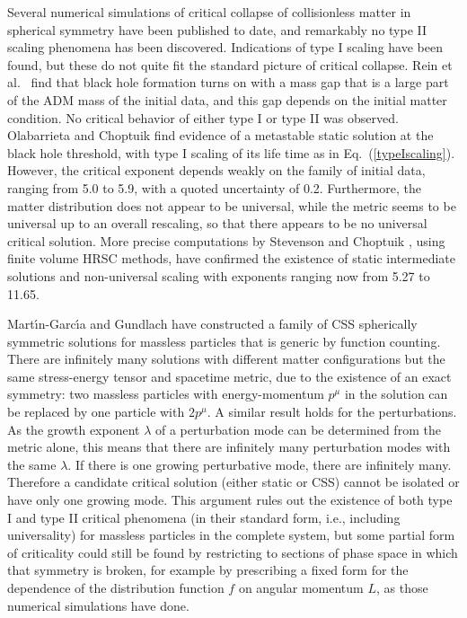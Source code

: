 \documentclass{article}
\begin{document}
Several numerical simulations of critical collapse of collisionless
matter in spherical symmetry have been published to date, and
remarkably no type II scaling phenomena has been discovered.
Indications of type I scaling have been found, but these do not
quite fit the standard picture of critical collapse. Rein et al.\
\cite{ReinRendallSchaeffer} find that black hole formation turns on
with a mass gap that is a large part of the ADM mass of the initial
data, and this gap depends on the initial matter condition.  No
critical behavior of either type I or type II was observed.
Olabarrieta and Choptuik \cite{OlabarrietaChoptuik} find evidence of a
metastable static solution at the black hole threshold, with type I
scaling of its life time as in Eq.\ (\ref{typeIscaling}).  However,
the critical exponent depends weakly on the family of initial data,
ranging from 5.0 to 5.9, with a quoted uncertainty of 0.2.
Furthermore, the matter distribution does not appear to be universal,
while the metric seems to be universal up to an overall rescaling,
so that there appears to be no universal critical solution. More
precise computations by Stevenson and Choptuik \cite{Stevenson}, using
finite volume HRSC methods, have confirmed the existence of static
intermediate solutions and non-universal scaling with exponents
ranging now from 5.27 to 11.65.

Mart\'\i n-Garc\'\i a and Gundlach \cite{vlasov1} have constructed
a family of CSS spherically symmetric solutions for massless particles
that is generic by function counting. There are infinitely many
solutions with different matter configurations but the same
stress-energy tensor and spacetime metric, due to the existence of an
exact symmetry: two massless particles with energy-momentum $p^\mu$
in the solution can be replaced by one particle with $2p^\mu$.
A similar result holds for the perturbations. As the growth exponent
$\lambda$ of a perturbation mode can be determined from the metric
alone, this means that there are infinitely many perturbation modes
with the same $\lambda$. If there is one growing perturbative mode,
there are infinitely many. Therefore a candidate critical solution
(either static or CSS) cannot be isolated or have only one growing mode.
This argument rules out the existence of both type I and
type II critical phenomena (in their standard form, i.e., including
universality) for massless particles in the complete system, but
some partial form of criticality could still be found by restricting
to sections of phase space in which that symmetry is broken, for
example by prescribing a fixed form for the dependence of the
distribution function $f$ on angular momentum $L$, as those
numerical simulations have done.
\end{document}
